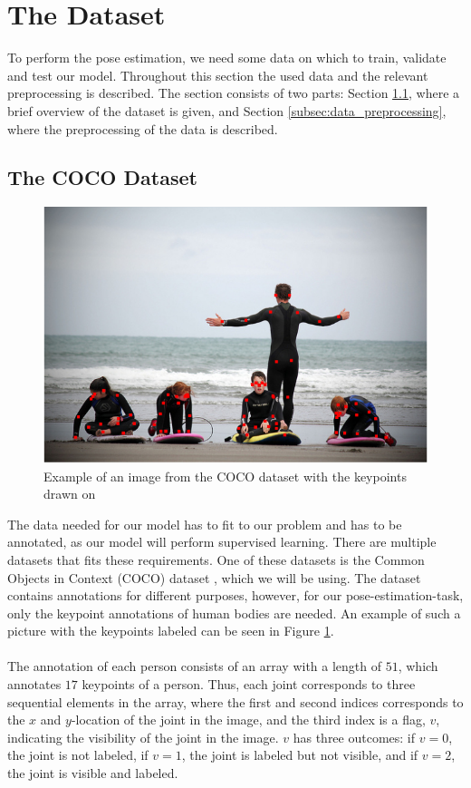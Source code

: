 \documentclass[./main.tex]{subfiles}
\begin{document}
\section{The Dataset}\label{sec:dataset}
To perform the pose estimation, we need some data on which to train, validate and test our model. Throughout this section the used data and the relevant preprocessing is described. The section consists of two parts: Section \ref{subsec:COCO}, where a brief overview of the dataset is given, and Section \ref{subsec:data_preprocessing}, where the preprocessing of the data is described. 

\subsection{The COCO Dataset}\label{subsec:COCO}
\begin{figure}[htbp]
    \centering
    \includegraphics[height = 4 cm]{./entities/coco_example.png}
    \caption{Example of an image from the COCO dataset with the keypoints drawn on \cite{COCO_article}}
    \label{fig:coco_example}
\end{figure}
\noindent The data needed for our model has to fit to our problem and has to be annotated, as our model will perform supervised learning. There are multiple datasets that fits these requirements. One of these datasets is the Common Objects in Context (COCO) dataset \cite{COCO_article}, which we will be using. The dataset contains annotations for different purposes, however, for our pose-estimation-task, only the keypoint annotations of human bodies are needed. An example of such a picture with the keypoints labeled can be seen in Figure \ref{fig:coco_example}. 
\\
\\
The annotation of each person consists of an array with a length of $51$, which annotates $17$ keypoints of a person. Thus, each joint corresponds to three sequential elements in the array, where the first and second indices corresponds to the $x$ and $y$-location of the joint in the image, and the third index is a flag, $v$, indicating the visibility of the joint in the image. $v$ has three outcomes: if $v = 0$, the joint is not labeled, if $v = 1$, the joint is labeled but not visible, and if $v = 2$, the joint is visible and labeled. 
\end{document}
